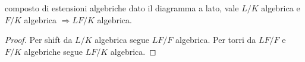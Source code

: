 \begin{minipage}{0.3\textwidth}  
\end{minipage}\hfill

\begin{minipage}{0.7\textwidth}
\begin{theorem}{composto di estensioni algebriche}
    dato il diagramma a lato, vale $L/K$ algebrica  e $F/K$ algebrica $\Rightarrow LF/K$ algebrica.
\end{theorem}
\begin{proof}
    Per shift da $L/K$ algebrica segue $LF/F$ algebrica. Per torri da $LF/F$ e $F/K$ algebriche segue $LF/K$ algebrica.
\end{proof}
\end{minipage}\hfill
\begin{minipage}{0.3\textwidth}  
\end{minipage}\hfill

